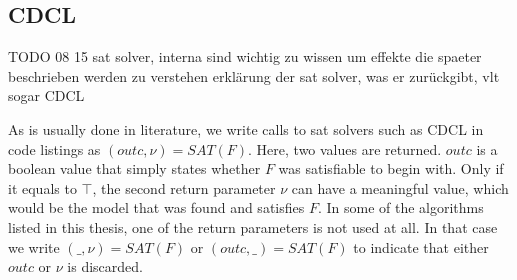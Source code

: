 \subsection{CDCL}

TODO 08 15 sat solver, interna sind wichtig zu wissen um effekte die spaeter beschrieben werden zu verstehen
erklärung der sat solver, was er zurückgibt, vlt sogar CDCL


As is usually done in literature, we write calls to sat solvers such as CDCL in code listings as $(outc,\nu) = SAT(F)$. Here, two values are returned. $outc$ is a boolean value that simply states whether $F$ was satisfiable to begin with. Only if it equals to $\top$, the second return parameter $\nu$ can have a meaningful value, which would be the model that was found and satisfies $F$. In some of the algorithms listed in this thesis, one of the return parameters is not used at all. In that case we write $(\_,\nu) = SAT(F)$ or $(outc,\_) = SAT(F)$ to indicate that either $outc$ or $\nu$ is discarded.